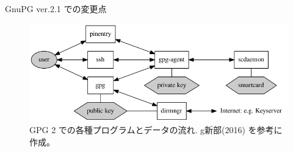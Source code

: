 \documentclass[cjk,c,squeeze,shrink,dvipdfmx,11pt,%
hyperref={bookmarks=true,bookmarksnumbered=true,bookmarksopen=false,%
colorlinks=false,%
pdftitle={},%
pdfauthor={}%
pdfinstitute={関西 Debian 勉強会},%
pdfsubject={},%
}]{beamer}
\begin{document}
\begin{frame}{GnuPG ver.2.1 での変更点}
  \begin{figure}[htbp!]
    \centering
    \includegraphics[width=.8\linewidth]{image201705/gnupg2.png}
    \caption{%
      GPG 2 での各種プログラムとデータの流れ.
      g新部(2016) を参考に作成。
    }
    \label{figure:GnuPG 2 での各種プログラムとデータの流れ}
  \end{figure}
\end{frame}
\end{document}
